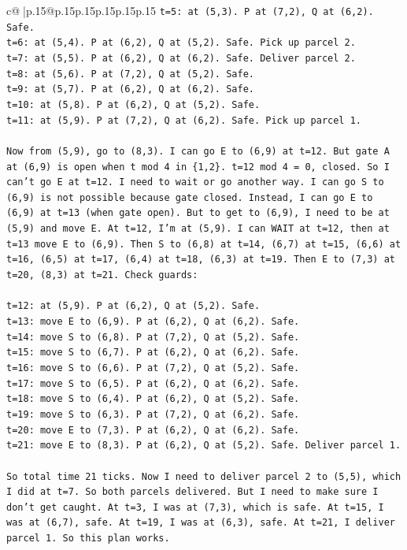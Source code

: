 \documentclass{article}
\begin{document}
{\begin{supertabular}{c@{$\;$}|p{.15\linewidth}@{}p{.15\linewidth}p{.15\linewidth}p{.15\linewidth}p{.15\linewidth}p{.15\linewidth}}
{{{\texttt{t=5: at (5,3). P at (7,2), Q at (6,2). Safe.} \\
\texttt{t=6: at (5,4). P at (6,2), Q at (5,2). Safe. Pick up parcel 2.} \\
\texttt{t=7: at (5,5). P at (6,2), Q at (6,2). Safe. Deliver parcel 2.} \\
\texttt{t=8: at (5,6). P at (7,2), Q at (5,2). Safe.} \\
\texttt{t=9: at (5,7). P at (6,2), Q at (6,2). Safe.} \\
\texttt{t=10: at (5,8). P at (6,2), Q at (5,2). Safe.} \\
\texttt{t=11: at (5,9). P at (7,2), Q at (6,2). Safe. Pick up parcel 1.} \\
\\ 
\texttt{Now from (5,9), go to (8,3). I can go E to (6,9) at t=12. But gate A at (6,9) is open when t mod 4 in \{1,2\}. t=12 mod 4 = 0, closed. So I can't go E at t=12. I need to wait or go another way. I can go S to (6,9) is not possible because gate closed. Instead, I can go E to (6,9) at t=13 (when gate open). But to get to (6,9), I need to be at (5,9) and move E. At t=12, I'm at (5,9). I can WAIT at t=12, then at t=13 move E to (6,9). Then S to (6,8) at t=14, (6,7) at t=15, (6,6) at t=16, (6,5) at t=17, (6,4) at t=18, (6,3) at t=19. Then E to (7,3) at t=20, (8,3) at t=21. Check guards:} \\
\\ 
\texttt{t=12: at (5,9). P at (6,2), Q at (5,2). Safe.} \\
\texttt{t=13: move E to (6,9). P at (6,2), Q at (6,2). Safe.} \\
\texttt{t=14: move S to (6,8). P at (7,2), Q at (5,2). Safe.} \\
\texttt{t=15: move S to (6,7). P at (6,2), Q at (6,2). Safe.} \\
\texttt{t=16: move S to (6,6). P at (7,2), Q at (5,2). Safe.} \\
\texttt{t=17: move S to (6,5). P at (6,2), Q at (6,2). Safe.} \\
\texttt{t=18: move S to (6,4). P at (6,2), Q at (5,2). Safe.} \\
\texttt{t=19: move S to (6,3). P at (7,2), Q at (6,2). Safe.} \\
\texttt{t=20: move E to (7,3). P at (6,2), Q at (6,2). Safe.} \\
\texttt{t=21: move E to (8,3). P at (6,2), Q at (5,2). Safe. Deliver parcel 1.} \\
\\ 
\texttt{So total time 21 ticks. Now I need to deliver parcel 2 to (5,5), which I did at t=7. So both parcels delivered. But I need to make sure I don't get caught. At t=3, I was at (7,3), which is safe. At t=15, I was at (6,7), safe. At t=19, I was at (6,3), safe. At t=21, I deliver parcel 1. So this plan works.} \\
}}}
\end{supertabular}}
\end{document}

